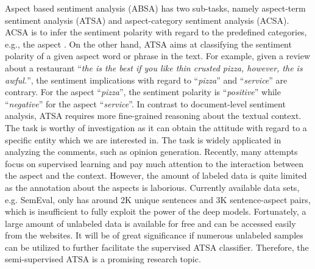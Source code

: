 \documentclass[11pt,a4paper]{article}
\begin{document}
Aspect based sentiment analysis (ABSA) has two sub-tasks, namely aspect-term sentiment analysis (ATSA) and aspect-category sentiment analysis (ACSA). ACSA is to infer the sentiment polarity with regard to the predefined categories, e.g., the aspect . On the other hand, ATSA aims at classifying the sentiment polarity of a given aspect word or phrase in the text. 
For example, given a review about a restaurant ``\emph{the  is the best if you like thin crusted pizza, however, the  is awful.}'', the sentiment implications with regard to ``\emph{pizza}'' and ``\emph{service}'' are contrary.
For the aspect ``\emph{pizza}'', the sentiment polarity is ``\emph{positive}'' while ``\emph{negative}'' for the aspect ``\emph{service}''.
In contrast to document-level sentiment analysis, ATSA requires more fine-grained reasoning about the textual context.
The task is worthy of investigation as it can obtain the attitude with regard to a specific entity which we are interested in. The task is widely applicated in analyzing the comments, such as opinion generation.
Recently, many attempts ~\cite{DBLP:conf/emnlp/TangQL16,DBLP:conf/acl/PanW18,DBLP:conf/naacl/LiuCB18,xue2018aspect,li2018hierarchical} focus on supervised learning and pay much attention to the interaction between the aspect and the context. However, the amount of labeled data is quite limited as the annotation about the aspects is laborious.
Currently available data sets, e.g. SemEval, only has around 2K unique sentences and 3K sentence-aspect pairs, which is insufficient to fully exploit the power of the deep models. Fortunately, a large amount of unlabeled data is available for free and can be accessed easily from the websites.
It will be of great significance if numerous unlabeled samples can be utilized to further facilitate the supervised ATSA classifier.
Therefore, the semi-supervised ATSA is a promising research topic.
\end{document}
